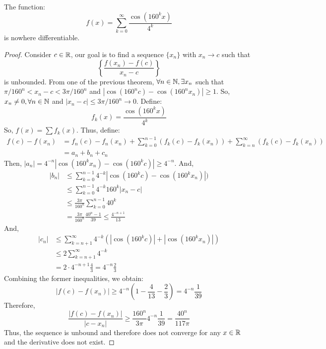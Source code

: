 \begin{theorem}
    The function:
    \begin{equation}
        f(x) = \sum \limits_{k = 0}^\infty \frac{\cos(160^k x)}{4^k}
    \end{equation}
    is nowhere differentiable.
\end{theorem}

\begin{proof}
    Consider $c \in \mathbb{R}$, our goal is to find a sequence $\{x_n\}$ with $x_n \to c$ such that
    \begin{equation*}
        \left \{
            \frac{f(x_n) - f(c)}{x_n - c}
        \right \}
    \end{equation*}
    is unbounded. From one of the previous theorem, $\forall n \in \mathbb{N}, \exists x_n$ such that $\pi/160^n < x_n - c < 3\pi/160^n$ and $|\cos (160^n c) - \cos (160^n x_n)| \geq 1$. So, $x_n \neq 0, \forall n \in \mathbb{N}$ and $|x_n - c| \leq 3 \pi/160^n \to 0$. Define:
    \begin{equation*}
        f_k(x) = \frac{\cos (160^k x)}{4^k}
    \end{equation*}
    So, $f(x) = \sum f_k(x)$. Thus, define:
    \begin{align*}
        f(c) - f(x_n) &= f_n(c) - f_n(x_n) + \sum \limits_{k=0}^{n-1}(f_k(c) - f_k(x_n)) + \sum \limits_{k=n}^\infty(f_k(c) - f_k(x_n)) \\
        &= a_n + b_n + c_n
    \end{align*}
    Then, $|a_n| = 4^{-n} |\cos (160^k x_n) - \cos (160^k c)| \geq 4^{-n}$. And,
    \begin{align*}
        |b_n| &\leq \sum \limits_{k=0}^{n-1} 4^{-k}|\cos (160^k c) - \cos (160^k x_n)|) \\
        &\leq \sum \limits_{k=0}^{n-1}4^{-k} 160^k |x_n - c| \\ 
        &\leq \frac{3 \pi}{160^n} \sum \limits_{k=0}^{n-1}40^k \\
        &= \frac{3 \pi}{160^n} \frac{40^n - 1}{39} \leq \frac{4^{-n+1}}{13}
    \end{align*}
    And,
    \begin{align*}
        |c_n| &\leq \sum \limits_{k = n+1}^\infty 4^{-k}(|\cos(160^k c)| + |\cos (160^k x_n)|) \\
        &\leq 2 \sum \limits_{k = n+1}^\infty 4^{-k} \\
        &= 2\cdot 4^{-n+1}\frac{4}{3} = 4^{-n} \frac{2}{3}
    \end{align*}
    Combining the former inequalities, we obtain:
    \begin{equation*}
        |f(c) - f(x_n)| \geq 4^{-n} \left(1 - \frac{4}{13} - \frac{2}{3} \right) = 4^{-n}\frac{1}{39}
    \end{equation*}
    Therefore,
    \begin{equation*}
        \frac{|f(c) - f(x_n)|}{|c-x_n|} \geq \frac{160^n}{3\pi} 4^{-n}\frac{1}{39} = \frac{40^n}{117 \pi}
    \end{equation*}
    Thus, the sequence is unbound and therefore does not converge for any $x \in \mathbb{R}$ and the derivative does not exist.
\end{proof}